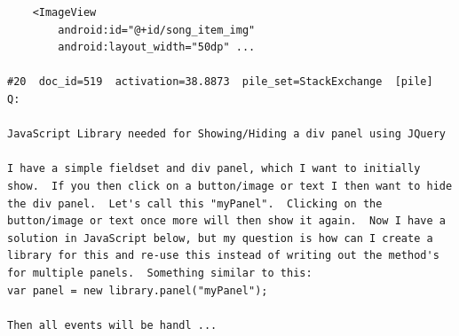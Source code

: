 \begin{verbatim}
    <ImageView
        android:id="@+id/song_item_img"
        android:layout_width="50dp" ...

#20  doc_id=519  activation=38.8873  pile_set=StackExchange  [pile]
Q:

JavaScript Library needed for Showing/Hiding a div panel using JQuery

I have a simple fieldset and div panel, which I want to initially show.  If you then click on a button/image or text I then want to hide the div panel.  Let's call this "myPanel".  Clicking on the button/image or text once more will then show it again.  Now I have a solution in JavaScript below, but my question is how can I create a library for this and re-use this instead of writing out the method's for multiple panels.  Something similar to this:
var panel = new library.panel("myPanel");

Then all events will be handl ...

\end{verbatim}

